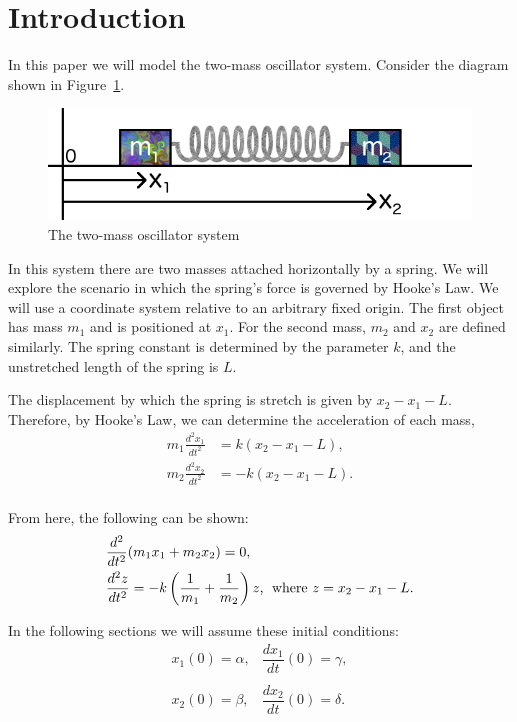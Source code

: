 \documentclass[11pt, oneside]{article}   	%
\begin{document}
\section{Introduction}
In this paper we will model the two-mass oscillator system.
Consider the diagram shown in Figure~\ref{sketch}.

\begin{figure}[h!]
\centering \includegraphics[scale=0.7]{sketch}
\caption{\label{sketch} The two-mass oscillator system}
\end{figure}

In this system there are two masses attached horizontally by a spring.
We will explore the scenario in which the spring's force is governed by Hooke's Law.
We will use a coordinate system relative to an arbitrary fixed origin.
The first object has mass $m_1$ and is positioned at $x_1$.
For the second mass, $m_2$ and $x_2$ are defined similarly.
The spring constant is determined by the parameter $k$, and the unstretched length of the spring is $L$.

The displacement by which the spring is stretch is given by $x_2 - x_1 -L$.
Therefore, by Hooke's Law, we can determine the acceleration of each mass,
\begin{align*}
m_1 \frac{d^2x_1}{dt^2} &= k(x_2 - x_1 - L), \\
m_2 \frac{d^2x_2}{dt^2} &= -k(x_2 - x_1 - L). \\
\end{align*}

From here, the following can be shown:
\begin{align}
&\frac{d^2}{dt^2}(m_1x_1 + m_2x_2) = 0, \label{eq:1}\\
&\frac{d^2z}{dt^2} = -k\left(\frac{1}{m_1}+\frac{1}{m_2}\right)z \text{, \;where } z = x_2-x_1-L. \label{eq:2}
\end{align}

In the following sections we will assume these initial conditions:
$$\begin{matrix}
x_1(0) = \alpha, & \dfrac{dx_1}{dt}(0) = \gamma, \\ &\\
x_2(0) = \beta, & \dfrac{dx_2}{dt}(0) = \delta.
\end{matrix}$$
\end{document}
